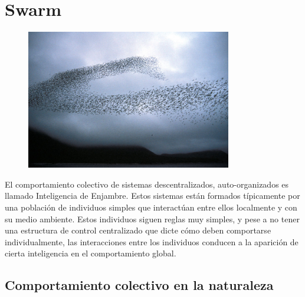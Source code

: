 
\chapter{Swarm} %

\label{Chapter3} %


\begin{figure}[htbp]
	\centering
		\includegraphics[width=0.8\textwidth]{./Figures/swarm.jpg}
	\label{fig:Bandada}
\end{figure}

El comportamiento colectivo de sistemas descentralizados, auto-organizados es llamado Inteligencia de Enjambre. Estos sistemas están formados típicamente por una población de individuos simples que interactúan entre ellos localmente y con su medio ambiente. Estos individuos siguen reglas muy simples, y pese a no tener una estructura de control centralizado que dicte cómo deben comportarse individualmente,  las interacciones entre los individuos conducen a la aparición de cierta inteligencia en el comportamiento global.


\section{Comportamiento colectivo en la naturaleza}



